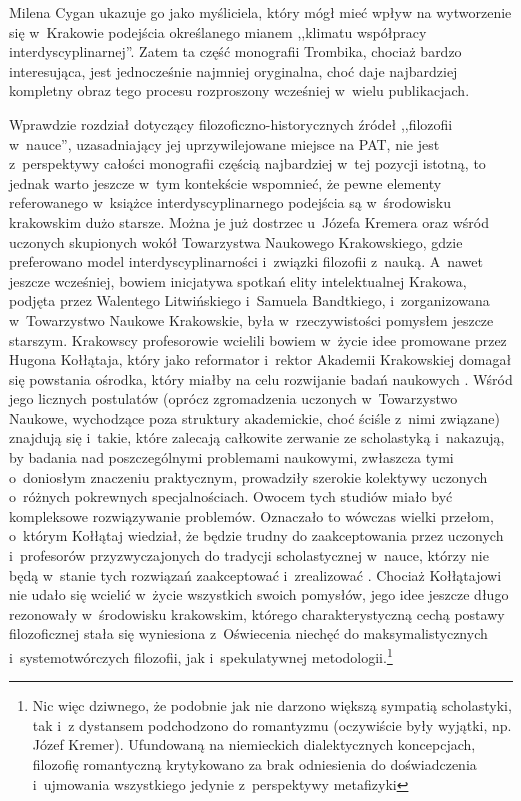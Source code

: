 \begin{newrevplenv}{Milena Cygan}
\parencite{polak_rola_2017} %
  ukazuje go jako myśliciela, który mógł mieć wpływ na wytworzenie się w~Krakowie podejścia określanego mianem ,,klimatu współpracy interdyscyplinarnej''. Zatem ta część monografii Trombika, chociaż bardzo interesująca, jest jednocześnie najmniej oryginalna, choć daje najbardziej kompletny obraz tego procesu rozproszony wcześniej w~wielu publikacjach. 

Wprawdzie rozdział dotyczący filozoficzno-historycznych źródeł ,,filozofii w~nauce'', uzasadniający jej uprzywilejowane miejsce na PAT, nie jest z~perspektywy całości monografii częścią najbardziej w~tej pozycji istotną, to jednak warto jeszcze w~tym kontekście wspomnieć, że pewne elementy referowanego w~książce interdyscyplinarnego podejścia są w~środowisku krakowskim dużo starsze. Można je już dostrzec u~Józefa Kremera 
\parencite[][s.~255]{polak_miedzy_2019} %
 oraz wśród uczonych skupionych wokół Towarzystwa Naukowego Krakowskiego, gdzie preferowano model interdyscyplinarności i~związki filozofii z~nauką. A~nawet jeszcze wcześniej, bowiem inicjatywa spotkań elity intelektualnej Krakowa, podjęta przez Walentego Litwińskiego i~Samuela Bandtkiego, i~zorganizowana w~Towarzystwo Naukowe Krakowskie, była w~rzeczywistości pomysłem jeszcze starszym. Krakowscy profesorowie wcielili bowiem w~życie idee promowane przez Hugona Kołłątaja, który jako reformator i~rektor Akademii Krakowskiej domagał się powstania ośrodka, który miałby na celu rozwijanie badań naukowych 
\parencite[][s.~16]{rederowa_z_1998}. %
 Wśród jego licznych postulatów (oprócz zgromadzenia uczonych w~Towarzystwo Naukowe, wychodzące poza struktury akademickie, choć ściśle z~nimi związane) znajdują się i~takie, które zalecają całkowite zerwanie ze scholastyką i~nakazują, by badania nad poszczególnymi problemami naukowymi, zwłaszcza tymi o~doniosłym znaczeniu praktycznym, prowadziły szerokie kolektywy uczonych o~różnych pokrewnych specjalnościach. Owocem tych studiów miało być kompleksowe rozwiązywanie problemów. Oznaczało to wówczas wielki przełom, o~którym Kołłątaj wiedział, że będzie trudny do zaakceptowania przez uczonych i~profesorów przyzwyczajonych do tradycji scholastycznej w~nauce, którzy nie będą w~stanie tych rozwiązań zaakceptować i~zrealizować 
\parencite[][s.~84]{hinz_refleksja_1962}. %
 Chociaż Kołłątajowi nie udało się wcielić w~życie wszystkich swoich pomysłów, jego idee jeszcze długo rezonowały w~środowisku krakowskim, którego charakterystyczną cechą postawy filozoficznej stała się wyniesiona z~Oświecenia niechęć do maksymalistycznych i~systemotwórczych filozofii, jak i~spekulatywnej metodologii.\footnote{Nic więc dziwnego, że podobnie jak nie darzono większą sympatią scholastyki, tak i~z dystansem podchodzono do romantyzmu (oczywiście były wyjątki, np. Józef Kremer). Ufundowaną na niemieckich dialektycznych koncepcjach, filozofię romantyczną krytykowano za brak odniesienia do doświadczenia i~ujmowania wszystkiego jedynie z~perspektywy metafizyki 
}
\end{newrevplenv}
